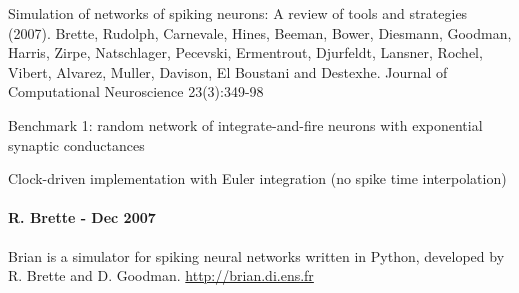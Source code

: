 \documentclass[letterpaper,10pt,english]{manual}
\begin{document}
Simulation of networks of spiking neurons: A review of tools and strategies (2007).
Brette, Rudolph, Carnevale, Hines, Beeman, Bower, Diesmann, Goodman, Harris, Zirpe,
Natschlager, Pecevski, Ermentrout, Djurfeldt, Lansner, Rochel, Vibert, Alvarez, Muller,
Davison, El Boustani and Destexhe.
Journal of Computational Neuroscience 23(3):349-98

Benchmark 1: random network of integrate-and-fire neurons with exponential synaptic conductances

Clock-driven implementation with Euler integration
(no spike time interpolation)


\paragraph{R. Brette - Dec 2007}

Brian is a simulator for spiking neural networks written in Python, developed by
R. Brette and D. Goodman.
\href{http://brian.di.ens.fr}{http://brian.di.ens.fr}
\end{document}
